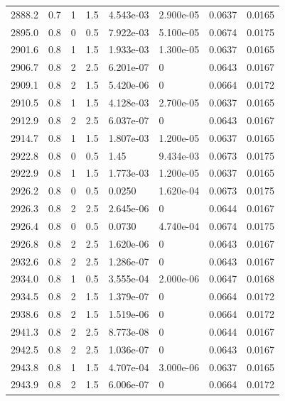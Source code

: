 \documentclass[preview]{standalone}
\begin{document}
{{{{{{{{{\begin{tabular}{L{1.2cm}C{1.2cm} C{0.3cm}C{0.5cm} C{1.4cm}C{1.4cm} C{1.4cm}C{1.4cm}}
  2888.2  &   0.7  & 1     & 1.5 &  4.543e-03  & 2.900e-05  & 0.0637 &  0.0165   \\ 
  2895.0  &   0.8  & 0     & 0.5 &  7.922e-03  & 5.100e-05  & 0.0674 &  0.0175   \\ 
  2901.6  &   0.8  & 1     & 1.5 &  1.933e-03  & 1.300e-05  & 0.0637 &  0.0165   \\ 
  2906.7  &   0.8  & 2     & 2.5 &  6.201e-07  & 0  & 0.0643 &  0.0167   \\ 
  2909.1  &   0.8  & 2     & 1.5 &  5.420e-06  & 0  & 0.0664 &  0.0172   \\ 
  2910.5  &   0.8  & 1     & 1.5 &  4.128e-03  & 2.700e-05  & 0.0637 &  0.0165   \\ 
  2912.9  &   0.8  & 2     & 2.5 &  6.037e-07  & 0  & 0.0643 &  0.0167   \\ 
  2914.7  &   0.8  & 1     & 1.5 &  1.807e-03  & 1.200e-05  & 0.0637 &  0.0165   \\ 
  2922.8  &   0.8  & 0     & 0.5 &  1.45  & 9.434e-03  & 0.0673 &  0.0175   \\ 
  2922.9  &   0.8  & 1     & 1.5 &  1.773e-03  & 1.200e-05  & 0.0637 &  0.0165   \\ 
  2926.2  &   0.8  & 0     & 0.5 &  0.0250  & 1.620e-04  & 0.0673 &  0.0175   \\ 
  2926.3  &   0.8  & 2     & 2.5 &  2.645e-06  & 0  & 0.0644 &  0.0167   \\ 
  2926.4  &   0.8  & 0     & 0.5 &  0.0730  & 4.740e-04  & 0.0674 &  0.0175   \\ 
  2926.8  &   0.8  & 2     & 2.5 &  1.620e-06  & 0  & 0.0643 &  0.0167   \\ 
  2932.6  &   0.8  & 2     & 2.5 &  1.286e-07  & 0  & 0.0643 &  0.0167   \\ 
  2934.0  &   0.8  & 1     & 0.5 &  3.555e-04  & 2.000e-06  & 0.0647 &  0.0168   \\ 
  2934.5  &   0.8  & 2     & 1.5 &  1.379e-07  & 0  & 0.0664 &  0.0172   \\ 
  2938.6  &   0.8  & 2     & 1.5 &  1.519e-06  & 0  & 0.0664 &  0.0172   \\ 
  2941.3  &   0.8  & 2     & 2.5 &  8.773e-08  & 0  & 0.0644 &  0.0167   \\ 
  2942.5  &   0.8  & 2     & 2.5 &  1.036e-07  & 0  & 0.0643 &  0.0167   \\ 
  2943.8  &   0.8  & 1     & 1.5 &  4.707e-04  & 3.000e-06  & 0.0637 &  0.0165   \\ 
  2943.9  &   0.8  & 2     & 1.5 &  6.006e-07  & 0  & 0.0664 &  0.0172   \\ 

\end{tabular}}}}}}}}}}
\end{document}
